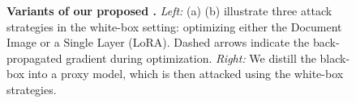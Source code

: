 \begin{figure}[t]
    \centering
    \caption{\textbf{Variants of our proposed \atk.} \emph{Left:} (a) (b) illustrate three attack strategies in the white-box setting: optimizing either the Document Image or a Single Layer (LoRA). Dashed arrows indicate the back-propagated gradient during optimization. \emph{Right:} We distill the black-box into a proxy model, which is then attacked using the white-box strategies.}
    \label{fig:method}
    \vspace{-0.3in}
\end{figure}
